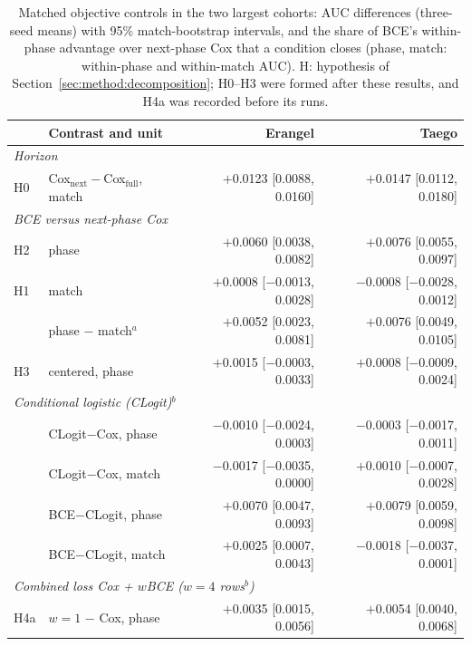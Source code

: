 \begin{table}[t]
\centering\footnotesize
\caption{Matched objective controls in the two largest cohorts: AUC differences (three-seed means) with 95\% match-bootstrap intervals, and the share of BCE's within-phase advantage over next-phase Cox that a condition closes (phase, match: within-phase and within-match AUC). H: hypothesis of Section~\ref{sec:method:decomposition}; H0--H3 were formed after these results, and H4a was recorded before its runs.}
\label{tab:objective}
\setlength{\tabcolsep}{1.6pt}
\begin{tabular}{@{}llrr@{}}
\toprule
 & Contrast and unit & Erangel & Taego \\
\midrule
\multicolumn{4}{l}{\emph{Horizon}} \\
H0 & Cox$_{\mathrm{next}}-$Cox$_{\mathrm{full}}$, match & $+$0.0123 {\scriptsize[0.0088, 0.0160]} & $+$0.0147 {\scriptsize[0.0112, 0.0180]} \\
\multicolumn{4}{l}{\emph{BCE versus next-phase Cox}} \\
H2 & phase & $+$0.0060 {\scriptsize[0.0038, 0.0082]} & $+$0.0076 {\scriptsize[0.0055, 0.0097]} \\
H1 & match & $+$0.0008 {\scriptsize[$-$0.0013, 0.0028]} & $-$0.0008 {\scriptsize[$-$0.0028, 0.0012]} \\
 & phase $-$ match$^{a}$ & $+$0.0052 {\scriptsize[0.0023, 0.0081]} & $+$0.0076 {\scriptsize[0.0049, 0.0105]} \\
H3 & centered, phase & $+$0.0015 {\scriptsize[$-$0.0003, 0.0033]} & $+$0.0008 {\scriptsize[$-$0.0009, 0.0024]} \\
\multicolumn{4}{l}{\emph{Conditional logistic (CLogit)$^{b}$}} \\
 & CLogit$-$Cox, phase & $-$0.0010 {\scriptsize[$-$0.0024, 0.0003]} & $-$0.0003 {\scriptsize[$-$0.0017, 0.0011]} \\
 & CLogit$-$Cox, match & $-$0.0017 {\scriptsize[$-$0.0035, 0.0000]} & $+$0.0010 {\scriptsize[$-$0.0007, 0.0028]} \\
 & BCE$-$CLogit, phase & $+$0.0070 {\scriptsize[0.0047, 0.0093]} & $+$0.0079 {\scriptsize[0.0059, 0.0098]} \\
 & BCE$-$CLogit, match & $+$0.0025 {\scriptsize[0.0007, 0.0043]} & $-$0.0018 {\scriptsize[$-$0.0037, 0.0001]} \\
\multicolumn{4}{l}{\emph{Combined loss Cox + $w$BCE ($w{=}4$ rows$^{b}$)}} \\
H4a & $w{=}1$ $-$ Cox, phase & $+$0.0035 {\scriptsize[0.0015, 0.0056]} & $+$0.0054 {\scriptsize[0.0040, 0.0068]} \\

\end{tabular}
\end{table}

